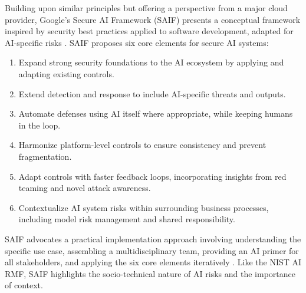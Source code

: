 Building upon similar principles but offering a perspective from a major cloud provider, Google's Secure AI Framework (SAIF) presents a conceptual framework inspired by security best practices applied to software development, adapted for AI-specific risks \cite{hansen_introducing_2023}. SAIF proposes six core elements for secure AI systems\cite{hansen_introducing_2023}:

\begin{enumerate}
    \item Expand strong security foundations to the AI ecosystem by applying and adapting existing controls.
    \item Extend detection and response to include AI-specific threats and outputs.
    \item Automate defenses using AI itself where appropriate, while keeping humans in the loop.
    \item Harmonize platform-level controls to ensure consistency and prevent fragmentation.
    \item Adapt controls with faster feedback loops, incorporating insights from red teaming and novel attack awareness.
    \item Contextualize AI system risks within surrounding business processes, including model risk management and shared responsibility.
\end{enumerate}

SAIF advocates a practical implementation approach involving understanding the specific use case, assembling a multidisciplinary team, providing an AI primer for all stakeholders, and applying the six core elements iteratively \cite{hansen_introducing_2023}. Like the NIST AI RMF, SAIF highlights the socio-technical nature of AI risks and the importance of context.

